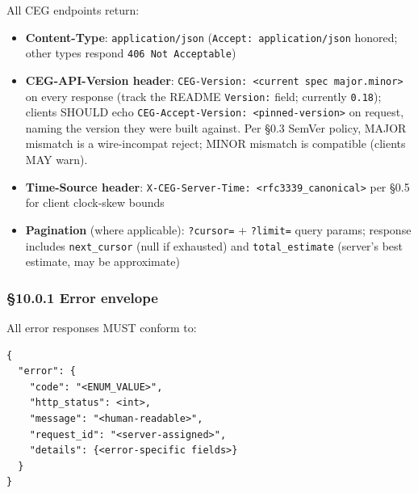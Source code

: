 \documentclass[11pt]{article}
\begin{document}
All CEG endpoints return:


\begin{itemize}\setlength\itemsep{0pt}
\item \textbf{Content-Type}: \texttt{application/json} (\texttt{Accept: application/json} honored; other types respond \texttt{406 Not Acceptable})
\item \textbf{CEG-API-Version header}: \texttt{CEG-Version: <current spec major.minor>} on every response (track the README \texttt{Version:} field; currently \texttt{0.18}); clients SHOULD echo \texttt{CEG-Accept-Version: <pinned-version>} on request, naming the version they were built against. Per §0.3 SemVer policy, MAJOR mismatch is a wire-incompat reject; MINOR mismatch is compatible (clients MAY warn).
\item \textbf{Time-Source header}: \texttt{X-CEG-Server-Time: <rfc3339\_canonical>} per §0.5 for client clock-skew bounds
\item \textbf{Pagination} (where applicable): \texttt{?cursor=} + \texttt{?limit=} query params; response includes \texttt{next\_cursor} (null if exhausted) and \texttt{total\_estimate} (server's best estimate, may be approximate)
\end{itemize}


\subsubsection*{§10.0.1 Error envelope}


All error responses MUST conform to:


\begin{lstlisting}
{
  "error": {
    "code": "<ENUM_VALUE>",
    "http_status": <int>,
    "message": "<human-readable>",
    "request_id": "<server-assigned>",
    "details": {<error-specific fields>}
  }
}
\end{lstlisting}
\end{document}
